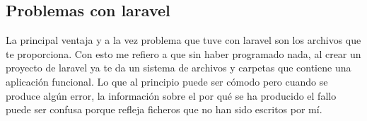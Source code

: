 \subsection{Problemas con laravel}
La principal ventaja y a la vez problema que tuve con laravel son los archivos que te proporciona. Con esto me refiero a que sin haber programado nada, al crear un proyecto de laravel ya te da un sistema de archivos y carpetas que contiene una aplicación funcional. Lo que al principio puede ser cómodo pero cuando se produce algún error, la información sobre el por qué se ha producido el fallo puede ser confusa porque refleja ficheros que no han sido escritos por mí.





